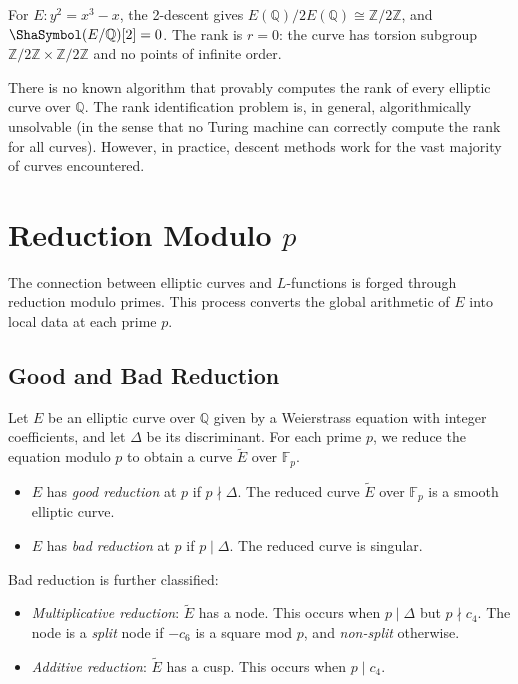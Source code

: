 \begin{example}
For $E: y^2 = x^3 - x$, the 2-descent gives $E(\mathbb{Q})/2E(\mathbb{Q}) \cong \mathbb{Z}/2\mathbb{Z}$, and $\Sha(E/\mathbb{Q})[2] = 0$. The rank is $r = 0$: the curve has torsion subgroup $\mathbb{Z}/2\mathbb{Z} \times \mathbb{Z}/2\mathbb{Z}$ and no points of infinite order.
\end{example}

\begin{remark}
There is no known algorithm that provably computes the rank of every elliptic curve over $\mathbb{Q}$. The rank identification problem is, in general, algorithmically unsolvable (in the sense that no Turing machine can correctly compute the rank for all curves). However, in practice, descent methods work for the vast majority of curves encountered.
\end{remark}

\section{Reduction Modulo $p$}
\label{sec:reduction}

The connection between elliptic curves and $L$-functions is forged through reduction modulo primes. This process converts the global arithmetic of $E$ into local data at each prime $p$.

\subsection{Good and Bad Reduction}

Let $E$ be an elliptic curve over $\mathbb{Q}$ given by a Weierstrass equation with integer coefficients, and let $\Delta$ be its discriminant. For each prime $p$, we reduce the equation modulo $p$ to obtain a curve $\widetilde{E}$ over $\mathbb{F}_p$.

\begin{definition}
\begin{itemize}
\item $E$ has \textit{good reduction} at $p$ if $p \nmid \Delta$. The reduced curve $\widetilde{E}$ over $\mathbb{F}_p$ is a smooth elliptic curve.
\item $E$ has \textit{bad reduction} at $p$ if $p \mid \Delta$. The reduced curve is singular.
\end{itemize}
\end{definition}

Bad reduction is further classified:
\begin{itemize}
\item \textit{Multiplicative reduction}: $\widetilde{E}$ has a node. This occurs when $p \mid \Delta$ but $p \nmid c_4$. The node is a \emph{split} node if $-c_6$ is a square mod $p$, and \emph{non-split} otherwise.
\item \textit{Additive reduction}: $\widetilde{E}$ has a cusp. This occurs when $p \mid c_4$.
\end{itemize}

